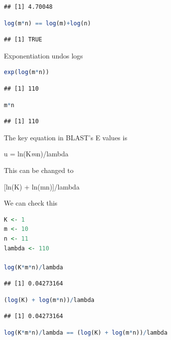 \documentclass[
]{book}
\begin{document}
\begin{lstlisting}
## [1] 4.70048
\end{lstlisting}

\begin{lstlisting}[language=R]
log(m*n) == log(m)+log(n)
\end{lstlisting}

\begin{lstlisting}
## [1] TRUE
\end{lstlisting}

Exponentiation undos logs

\begin{lstlisting}[language=R]
exp(log(m*n))
\end{lstlisting}

\begin{lstlisting}
## [1] 110
\end{lstlisting}

\begin{lstlisting}[language=R]
m*n
\end{lstlisting}

\begin{lstlisting}
## [1] 110
\end{lstlisting}

The key equation in BLAST's E values is

u = ln(K\emph{m}n)/lambda

This can be changed to

{[}ln(K) + ln(mn){]}/lambda

We can check this

\begin{lstlisting}[language=R]
K <- 1
m <- 10
n <- 11
lambda <- 110

log(K*m*n)/lambda
\end{lstlisting}

\begin{lstlisting}
## [1] 0.04273164
\end{lstlisting}

\begin{lstlisting}[language=R]
(log(K) + log(m*n))/lambda
\end{lstlisting}

\begin{lstlisting}
## [1] 0.04273164
\end{lstlisting}

\begin{lstlisting}[language=R]
log(K*m*n)/lambda == (log(K) + log(m*n))/lambda
\end{lstlisting}
\end{document}
